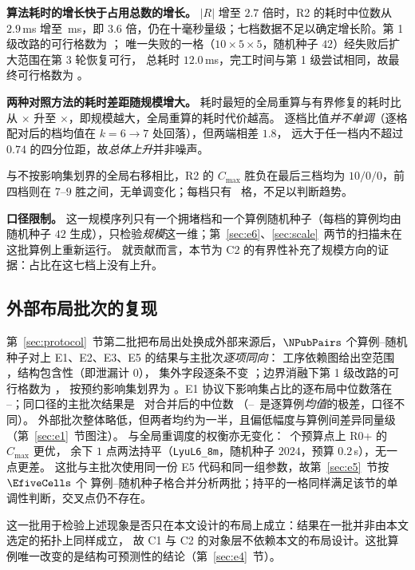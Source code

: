 \textbf{算法耗时的增长快于占用总数的增长。} \(|R|\) 增至 \(2.7\) 倍时，R2 的耗时中位数从
\(2.9\)\,ms 增至 \ScaleMsHi\,ms，即 \(3.6\) 倍，仍在十毫秒量级；七档数据不足以确定增长阶。第 1 级改路的可行格数为 \ScaleFeasFirst；
唯一失败的一格（\(10\times5\times5\)，随机种子 \(42\)）经失败后扩大范围在第 \(3\) 轮恢复可行，
总耗时 \(12.0\)\,ms，完工时间与第 1 级尝试相同，故最终可行格数为 \ScaleFeasAll。

\textbf{两种对照方法的耗时差距随规模增大。} 耗时最短的全局重算与有界修复的耗时比
从 \ScaleRatioLo\(\times\) 升至 \ScaleRatioHi\(\times\)，即规模越大，全局重算的耗时代价越高。
逐档比值\emph{并不单调}（逐格配对后的档均值在 \(k=6\to 7\) 处回落），但两端相差 \(1.8\)，
远大于任一档内不超过 \(0.74\) 的四分位距，故\emph{总体上升}并非噪声。

与不按影响集划界的全局右移相比，R2 的 \(C_{\max}\) 胜负在最后三档均为 \(10/0/0\)，前四档则在
\(7\)--\(9\) 胜之间，无单调变化；每档只有 \NSeeds\ 格，不足以判断趋势。

\textbf{口径限制。} 这一规模序列只有一个拥堵档和一个算例随机种子（每档的算例均由随机种子
\(42\) 生成），只检验\emph{规模}这一维；第~\ref{sec:e6}、\ref{sec:scale}~两节的扫描未在这批算例上重新运行。
就贡献而言，本节为 C2 的有界性补充了规模方向的证据：占比在这七档上没有上升。

\subsection{外部布局批次的复现}
\label{sec:pubrepro}

第~\ref{sec:protocol}~节第二批把布局出处换成外部来源后，\(\NPubPairs\) 个算例--随机种子对上
E1、E2、E3、E5 的结果与主批次\emph{逐项同向}：
工序依赖图给出空范围 \PubPassMiss，结构包含性（即泄漏计 \(0\)）\PubPassClosed，
集外字段逐条不变 \PubPassInvar；边界消融下第 1 级改路的可行格数为 \PubFeasRone，
按预约影响集划界为 \PubFeasRtwo。E1 协议下影响集占比的逐布局中位数落在
\PubEoneFracLo--\PubEoneFracHi；同口径的主批次结果是 \NPairs\ 对合并后的中位数 \EoneFracMed
（\EoneCloLo--\EoneCloHi\ 是逐算例\emph{均值}的极差，口径不同）。
外部批次整体略低，但两者均约为一半，且偏低幅度与算例间差异同量级（第~\ref{sec:e1}~节图注）。
与全局重调度的权衡亦无变化：\PubEfiveNoCross\ 个预算点上 R0+ 的 \(C_{\max}\) 更优，
余下 \(1\) 点两法持平（\texttt{LyuL6\_8m}，随机种子 \(2024\)，预算 \(0.2\)\,s），无一点更差。
这批与主批次使用同一份 E5 代码和同一组参数，故第~\ref{sec:e5}~节按 \(\EfiveCells\) 个
算例--随机种子格合并分析两批；持平的一格同样满足该节的单调性判断，交叉点仍不存在。

这一批用于检验上述现象是否只在本文设计的布局上成立：结果在一批并非由本文选定的拓扑上同样成立，
故 C1 与 C2 的对象层不依赖本文的布局设计。这批算例唯一改变的是结构可预测性的结论（第~\ref{sec:e4}~节）。

